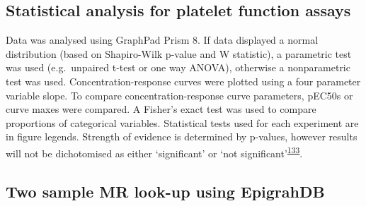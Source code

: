 \documentclass[11pt,twoside]{bristolthesis}
\begin{document}
\hypertarget{statistical-analysis-for-platelet-function-assays-1}{%
\subsection{Statistical analysis for platelet function assays}\label{statistical-analysis-for-platelet-function-assays-1}}

Data was analysed using GraphPad Prism 8. If data displayed a normal distribution (based on Shapiro-Wilk p-value and W statistic), a parametric test was used (e.g.~unpaired t-test or one way ANOVA), otherwise a nonparametric test was used. Concentration-response curves were plotted using a four parameter variable slope. To compare concentration-response curve parameters, pEC50s or curve maxes were compared. A Fisher's exact test was used to compare proportions of categorical variables. Statistical tests used for each experiment are in figure legends. Strength of evidence is determined by p-values, however results will not be dichotomised as either `significant' or `not significant'\textsuperscript{\protect\hyperlink{ref-Sterne2001}{133}}.

\hypertarget{two-sample-mr-look-up-using-epigrahdb}{%
\subsection{Two sample MR look-up using EpigrahDB}\label{two-sample-mr-look-up-using-epigrahdb}}
\end{document}

